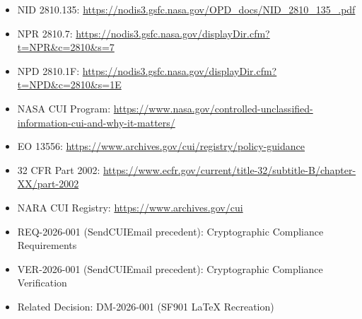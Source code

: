{\begin{enumerate}
\begin{itemize}
    \item NID 2810.135: \url{https://nodis3.gsfc.nasa.gov/OPD_docs/NID_2810_135_.pdf}
    \item NPR 2810.7: \url{https://nodis3.gsfc.nasa.gov/displayDir.cfm?t=NPR&c=2810&s=7}
    \item NPD 2810.1F: \url{https://nodis3.gsfc.nasa.gov/displayDir.cfm?t=NPD&c=2810&s=1E}
    \item NASA CUI Program: \url{https://www.nasa.gov/controlled-unclassified-information-cui-and-why-it-matters/}
    \item EO 13556: \url{https://www.archives.gov/cui/registry/policy-guidance}
    \item 32 CFR Part 2002: \url{https://www.ecfr.gov/current/title-32/subtitle-B/chapter-XX/part-2002}
    \item NARA CUI Registry: \url{https://www.archives.gov/cui}
    \item REQ-2026-001 (SendCUIEmail precedent): Cryptographic Compliance Requirements
    \item VER-2026-001 (SendCUIEmail precedent): Cryptographic Compliance Verification
    \item Related Decision: DM-2026-001 (SF901 LaTeX Recreation)
\end{itemize}

\end{enumerate}
}


